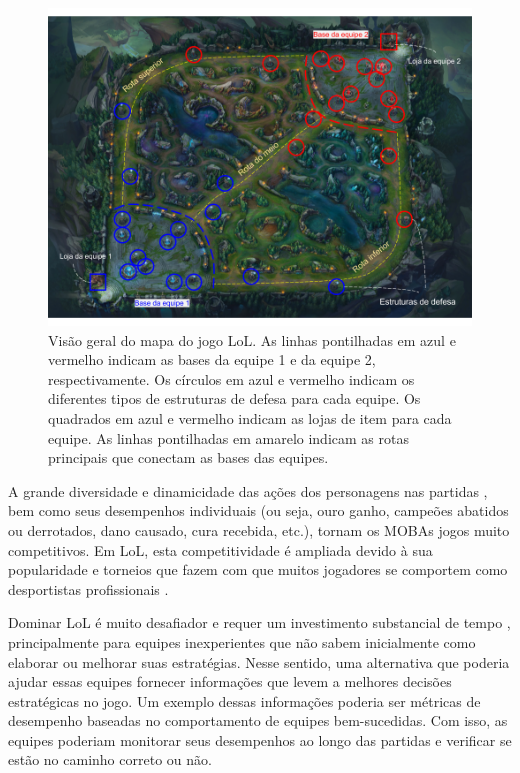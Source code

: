 \begin{figure}
  \centering
  \includegraphics[width=1.0\textwidth]{map}%
  \caption{Visão geral do mapa do jogo LoL. As linhas pontilhadas em azul e vermelho indicam as bases da equipe 1 e da equipe 2, respectivamente.  Os círculos em azul e vermelho indicam os diferentes tipos de estruturas de defesa para cada equipe. Os quadrados em azul e vermelho indicam as lojas de item para cada equipe. As linhas pontilhadas em amarelo indicam as rotas principais que conectam as bases das equipes.}
  \label{fig:map}
\end{figure}

A grande diversidade e dinamicidade das ações dos personagens nas partidas \cite{drachen2014skill}, bem como seus desempenhos individuais (ou seja, ouro ganho, campeões abatidos ou derrotados, dano causado, cura recebida, etc.), tornam os MOBAs jogos muito competitivos. Em LoL, esta competitividade é ampliada devido à sua popularidade e torneios que fazem com que muitos jogadores se comportem como desportistas profissionais \cite{rioult2014mining}.

Dominar LoL é muito desafiador e requer um investimento substancial de tempo \cite{drachen2014skill}, principalmente para equipes inexperientes que não sabem inicialmente como elaborar ou melhorar suas estratégias. Nesse sentido, uma alternativa que poderia ajudar essas equipes  fornecer informações que levem a melhores decisões estratégicas no jogo. Um exemplo dessas informações poderia ser métricas de desempenho baseadas no comportamento de equipes bem-sucedidas. Com isso, as equipes poderiam monitorar seus desempenhos ao longo das partidas e verificar se estão no caminho correto ou não. 

